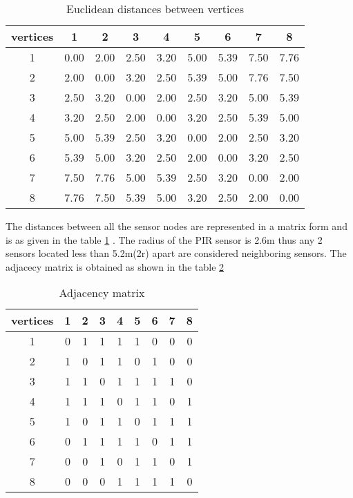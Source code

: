 \begin{table}[]
\centering
\caption{Euclidean distances between vertices}
\label{tab:dist}
\begin{tabular}{|c|c|c|c|c|c|c|c|c|}
\hline
vertices & 1    & 2    & 3    & 4    & 5    & 6    & 7    & 8    \\ \hline
1        & 0.00 & 2.00 & 2.50 & 3.20 & 5.00 & 5.39 & 7.50 & 7.76 \\ \hline
2        & 2.00 & 0.00 & 3.20 & 2.50 & 5.39 & 5.00 & 7.76 & 7.50 \\ \hline
3        & 2.50 & 3.20 & 0.00 & 2.00 & 2.50 & 3.20 & 5.00 & 5.39 \\ \hline
4        & 3.20 & 2.50 & 2.00 & 0.00 & 3.20 & 2.50 & 5.39 & 5.00 \\ \hline
5        & 5.00 & 5.39 & 2.50 & 3.20 & 0.00 & 2.00 & 2.50 & 3.20 \\ \hline
6        & 5.39 & 5.00 & 3.20 & 2.50 & 2.00 & 0.00 & 3.20 & 2.50 \\ \hline
7        & 7.50 & 7.76 & 5.00 & 5.39 & 2.50 & 3.20 & 0.00 & 2.00 \\ \hline
8        & 7.76 & 7.50 & 5.39 & 5.00 & 3.20 & 2.50 & 2.00 & 0.00 \\ \hline
\end{tabular}
\end{table}

The distances between all the sensor nodes are represented in a matrix form and is as given in the table \ref{tab:dist} . The radius of the PIR sensor is 2.6m thus any 2 sensors located less than 5.2m(2r) apart are considered neighboring sensors. The adjacecy matrix is obtained as shown in the table \ref{tab:am}

\begin{table}[]
\centering
\caption{Adjacency matrix}
\label{tab:am}
\begin{tabular}{|c|c|c|c|c|c|c|c|c|}
\hline
vertices & 1 & 2 & 3 & 4 & 5 & 6 & 7 & 8 \\ \hline
1        & 0 & 1 & 1 & 1 & 1 & 0 & 0 & 0 \\ \hline
2        & 1 & 0 & 1 & 1 & 0 & 1 & 0 & 0 \\ \hline
3        & 1 & 1 & 0 & 1 & 1 & 1 & 1 & 0 \\ \hline
4        & 1 & 1 & 1 & 0 & 1 & 1 & 0 & 1 \\ \hline
5        & 1 & 0 & 1 & 1 & 0 & 1 & 1 & 1 \\ \hline
6        & 0 & 1 & 1 & 1 & 1 & 0 & 1 & 1 \\ \hline
7        & 0 & 0 & 1 & 0 & 1 & 1 & 0 & 1 \\ \hline
8        & 0 & 0 & 0 & 1 & 1 & 1 & 1 & 0 \\ \hline
\end{tabular}
\end{table}


